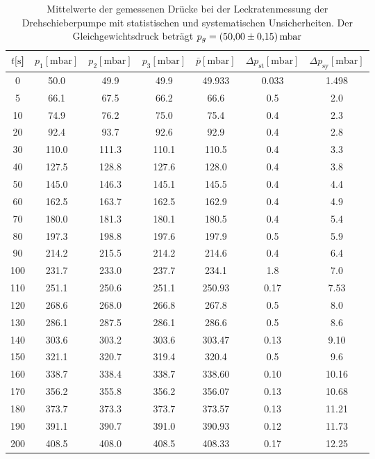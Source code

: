 %
\begin{table}[H]
  \centering
    \caption{Mittelwerte der gemessenen Drücke bei der Leckratenmessung der Drehschieberpumpe mit statistischen und systematischen Unsicherheiten. Der Gleichgewichtsdruck beträgt $p_g=\SI{50 \pm 0.15}{\milli\bar}$}
    \label{tab:Dreh_Leck3}
    \begin{tabular}{
      S[table-format=3.0] 
      S[table-format=3.1] S[table-format=3.1] S[table-format=3.1]
      S[table-format=3.2] S[table-format=1.2] S[table-format=2.1]
      }
      \toprule
      {$t [\si{\second}$]} &
      {$p_1 [\si{\milli\bar}]$} & {$p_2 [\si{\milli\bar}]$} & {$p_3 [\si{\milli\bar}]$} &
      {$\bar{p} [\si{\milli\bar}]$} & {$\Delta p_\text{st} [\si{\milli\bar}]$} & {$\Delta p_\text{sy} [\si{\milli\bar}]$}\\
          & 50.0  & 49.9  & 49.9  & 49.933 & 0.033 & 1.498 \\
      5    & 66.1  & 67.5  & 66.2  & 66.6   & 0.5   & 2.0   \\
      10   & 74.9  & 76.2  & 75.0  & 75.4   & 0.4   & 2.3   \\
      20   & 92.4  & 93.7  & 92.6  & 92.9   & 0.4   & 2.8   \\
      30   & 110.0 & 111.3 & 110.1 & 110.5  & 0.4   & 3.3   \\
      40   & 127.5 & 128.8 & 127.6 & 128.0  & 0.4   & 3.8   \\
      50   & 145.0 & 146.3 & 145.1 & 145.5  & 0.4   & 4.4   \\
      60   & 162.5 & 163.7 & 162.5 & 162.9  & 0.4   & 4.9   \\
      70   & 180.0 & 181.3 & 180.1 & 180.5  & 0.4   & 5.4   \\
      80   & 197.3 & 198.8 & 197.6 & 197.9  & 0.5   & 5.9   \\
      90   & 214.2 & 215.5 & 214.2 & 214.6  & 0.4   & 6.4   \\
      100  & 231.7 & 233.0 & 237.7 & 234.1  & 1.8   & 7.0   \\
      110  & 251.1 & 250.6 & 251.1 & 250.93 & 0.17  & 7.53  \\
      120  & 268.6 & 268.0 & 266.8 & 267.8  & 0.5   & 8.0   \\
      130  & 286.1 & 287.5 & 286.1 & 286.6  & 0.5   & 8.6   \\
      140  & 303.6 & 303.2 & 303.6 & 303.47 & 0.13  & 9.10  \\
      150  & 321.1 & 320.7 & 319.4 & 320.4  & 0.5   & 9.6   \\
      160  & 338.7 & 338.4 & 338.7 & 338.60 & 0.10  & 10.16 \\
      170  & 356.2 & 355.8 & 356.2 & 356.07 & 0.13  & 10.68 \\
      180  & 373.7 & 373.3 & 373.7 & 373.57 & 0.13  & 11.21 \\
      190  & 391.1 & 390.7 & 391.0 & 390.93 & 0.12  & 11.73 \\
      200  & 408.5 & 408.0 & 408.5 & 408.33 & 0.17  & 12.25 \\
      \bottomrule
    \end{tabular}
\end{table}
